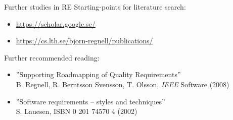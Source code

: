\documentclass{simpleslides}
\begin{document}
\begin{frame}[fragile]{Further studies in RE}
  Starting-points for literature search:

\begin{itemize}\footnotesize
\item \url{https://scholar.google.se/}\\
\item \url{https://cs.lth.se/bjorn-regnell/publications/}\\
\end{itemize}


  Further recommended reading: 
\begin{itemize}\footnotesize
  \item ''Supporting Roadmapping of Quality Requirements'' \\ B. Regnell, R. Berntsson Svensson, T. Olsson, \emph{IEEE} Software (2008) 
  \item ''Software requirements -- styles and techniques'' \\ S. Lauesen, ISBN 0 201 74570 4  (2002) 
\end{itemize}

\end{frame}
\end{document}
